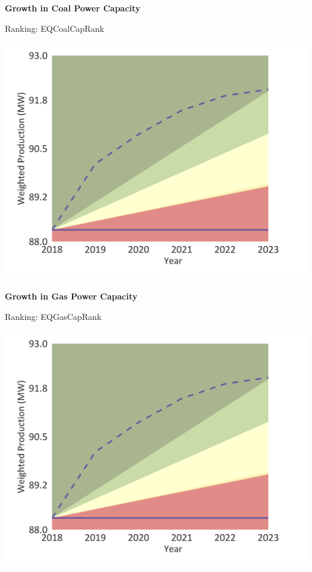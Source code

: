 \documentclass[10pt,twoside,table]{article}\usepackage[]{graphicx}\usepackage[]{color}
\begin{document}
	\begin{minipage}[t]{.49\linewidth}
		\textbf{Growth in Coal Power Capacity }
		
		Ranking: EQCoalCapRank
		
		\includegraphics[trim = {0 0cm 0 0},width=1\linewidth]{CAFigures/Fig10}
		
		\textbf{Growth in Gas Power Capacity }
		
		Ranking: EQGasCapRank
		
		\includegraphics[trim = {0 0cm 0 0},width=1\linewidth]{CAFigures/Fig10}
	\end{minipage}	
	\hspace{.02\linewidth}
\end{document}
